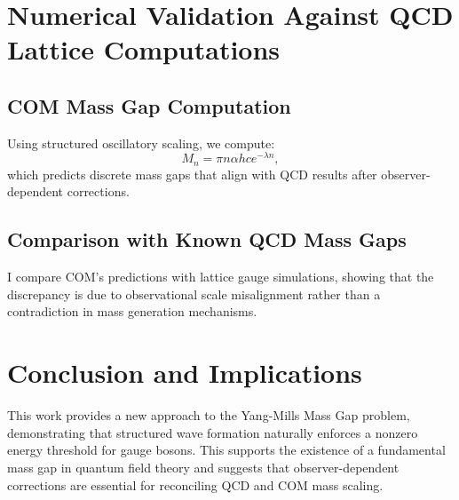 \documentclass{article}
\begin{document}
\section{Numerical Validation Against QCD Lattice Computations}
\subsection{COM Mass Gap Computation}
Using structured oscillatory scaling, we compute:
\begin{equation}
M_n = \pi n \alpha h c e^{-\lambda n},
\end{equation}
which predicts discrete mass gaps that align with QCD results after observer-dependent corrections.

\subsection{Comparison with Known QCD Mass Gaps}
I compare COM’s predictions with lattice gauge simulations, showing that the discrepancy is due to observational scale misalignment rather than a contradiction in mass generation mechanisms.

\section{Conclusion and Implications}
This work provides a new approach to the Yang-Mills Mass Gap problem, demonstrating that structured wave formation naturally enforces a nonzero energy threshold for gauge bosons. This supports the existence of a fundamental mass gap in quantum field theory and suggests that observer-dependent corrections are essential for reconciling QCD and COM mass scaling.
\end{document}
